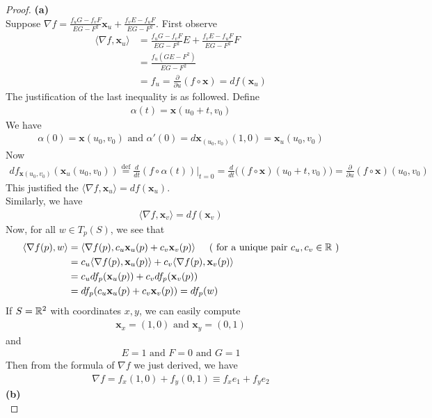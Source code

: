 \documentclass{report}
\begin{document}
\begin{proof}
\textbf{(a)}\\

Suppose $\nabla f= \frac{f_uG-f_vF}{EG-F^2}\textbf{x}_u+ \frac{f_vE-f_uF}{EG-F^2}$. First observe 
\begin{align*}
\langle \nabla f, \textbf{x}_u\rangle &= \frac{f_u G -f_v F}{EG-F^2} E+ \frac{f_v E-f_u F}{EG-F^2}F\\
&=\frac{f_u(GE-F^2)}{EG-F^2}\\
&=f_u=\frac{\partial }{\partial u}(f \circ \textbf{x})=df(\textbf{x}_u)
\end{align*}
The justification of the last inequality is as followed. Define 
\begin{align*}
\alpha (t)=\textbf{x}(u_0+t,v_0)
\end{align*}
We have 
\begin{align*}
\alpha (0)=\textbf{x}(u_0,v_0)\text{ and }\alpha '(0)=d\textbf{x}_{(u_0,v_0)}(1,0)=\textbf{x}_u(u_0,v_0)
\end{align*}
Now
\begin{align*}
df_{\textbf{x}(u_0,v_0)}(\textbf{x}_u(u_0,v_0))\overset{\text{def}}{=}\frac{d}{dt}(f\circ \alpha (t))\Big|_{t=0}=\frac{d}{dt}\big((f\circ \textbf{x})(u_0+t,v_0)\big)=\frac{\partial}{\partial u}(f\circ \textbf{x})(u_0,v_0)
\end{align*}
This justified the $\langle \nabla f, \textbf{x}_u\rangle =df(\textbf{x}_u)$.\\

Similarly, we have 
\begin{align*}
\langle \nabla f,\textbf{x}_v\rangle =df(\textbf{x}_v)
\end{align*}
Now, for all $w\in T_p(S)$, we see that 
\begin{align*}
\langle \nabla f(p),w\rangle&= \langle \nabla f(p),c_u\textbf{x}_u(p)+c_v\textbf{x}_v(p)\rangle\hspace{0.5cm}(\text{ for a unique pair $c_u,c_v\in\mathbb{R}$ })\\
&=c_u\langle \nabla f(p),\textbf{x}_u(p)\rangle + c_v \langle \nabla f(p),\textbf{x}_v(p)\rangle \\
&=c_u df_p(\textbf{x}_u(p))+c_vdf_p(\textbf{x}_v(p))\\
&=df_p(c_u\textbf{x}_u(p)+c_v\textbf{x}_v(p))=df_p(w)
\end{align*}
If $S=\mathbb{R}^2$ with coordinates  $x,y$, we can easily compute 
 \begin{align*}
\textbf{x}_x=(1,0)\text{ and }\textbf{x}_y=(0,1)
\end{align*}
and 
\begin{align*}
E=1\text{ and }F=0\text{ and }G=1
\end{align*}
Then from the formula of $\nabla f$ we just derived, we have 
\begin{align*}
\nabla f= f_x(1,0)+f_y(0,1)\equiv f_xe_1+f_ye_2
\end{align*}
\textbf{(b)}\\


\end{proof}
\end{document}

